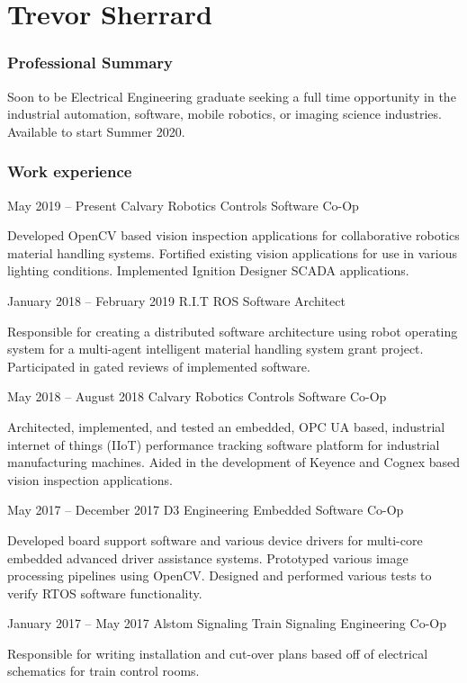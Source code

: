 \documentclass{tccv}
\begin{document}
\part{Trevor Sherrard}

\section{Professional Summary}
Soon to be Electrical Engineering graduate seeking a full time opportunity in the industrial automation, software, mobile robotics, or imaging science industries. Available to start Summer 2020.

\section{Work experience}

\begin{eventlist}

\item{May 2019 -- Present}
     {Calvary Robotics}
     {Controls Software Co-Op}
     
Developed OpenCV based vision inspection applications for collaborative robotics material handling systems. Fortified existing vision applications for use in various lighting conditions. Implemented Ignition Designer SCADA applications.

\item{January 2018 -- February 2019}
     {R.I.T}
     {ROS Software Architect}

Responsible for creating a distributed software architecture using robot operating system for a multi-agent intelligent material handling system grant project. Participated in gated reviews of implemented software.

\item{May 2018 -- August 2018}
     {Calvary Robotics}
     {Controls Software Co-Op}

Architected, implemented, and tested an embedded, OPC UA based, industrial internet of things (IIoT) performance tracking software platform for industrial manufacturing machines. Aided in the development of Keyence and Cognex based vision inspection applications.

\item{May 2017 -- December 2017}
     {D3 Engineering}
     {Embedded Software Co-Op}
     
Developed board support software and various device drivers for multi-core embedded advanced driver assistance systems. Prototyped various image processing pipelines using OpenCV. Designed and performed various tests to verify RTOS software functionality.

\item{January 2017 -- May 2017}
     {Alstom Signaling}
     {Train Signaling Engineering Co-Op}

Responsible for writing installation and cut-over plans based off of electrical schematics for train control rooms.

\end{eventlist}
\end{document}
